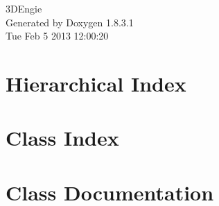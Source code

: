 \documentclass{book}
\begin{document}
\hypersetup{pageanchor=false,citecolor=blue}
\begin{titlepage}
\vspace*{7cm}
\begin{center}
{\Large 3\-D\-Engie }\\
\vspace*{1cm}
{\large Generated by Doxygen 1.8.3.1}\\
\vspace*{0.5cm}
{\small Tue Feb 5 2013 12:00:20}\\
\end{center}
\end{titlepage}
\clearemptydoublepage
{}
\tableofcontents
\clearemptydoublepage
{}
\hypersetup{pageanchor=true,citecolor=blue}
\chapter{Hierarchical Index}

\chapter{Class Index}

\chapter{Class Documentation}
























\printindex
\end{document}
